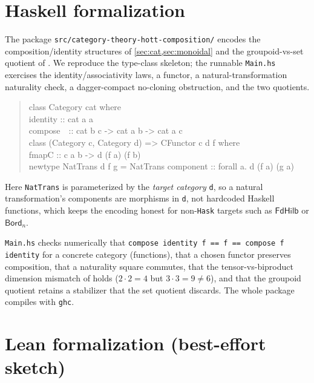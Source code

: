 \documentclass[12pt]{article}
\theoremstyle{definition}
\theoremstyle{remark}
\newcommand{\FdHilb}{\mathsf{FdHilb}}
\newcommand{\Bord}{\mathsf{Bord}}
\begin{document}
\section{Haskell formalization}
\label{sec:haskell}

The package \texttt{src/category-theory-hott-composition/} encodes the
composition/identity structures of \cref{sec:cat,sec:monoidal} and the
groupoid-vs-set quotient of . We reproduce the type-class
skeleton; the runnable \texttt{Main.hs} exercises the identity/associativity
laws, a functor, a natural-transformation naturality check, a dagger-compact
no-cloning obstruction, and the two quotients.

\begin{quote}\footnotesize\ttfamily
class Category cat where\\
\hspace*{2em}identity :: cat a a\\
\hspace*{2em}compose\ \ :: cat b c -> cat a b -> cat a c\\[0.4em]
class (Category c, Category d) => CFunctor c d f where\\
\hspace*{2em}fmapC :: c a b -> d (f a) (f b)\\[0.4em]
newtype NatTrans d f g = NatTrans  component :: forall a. d (f a) (g a) 
\end{quote}
Here \texttt{NatTrans} is parameterized by the \emph{target category}
\texttt{d}, so a natural transformation's components are morphisms in
\texttt{d}, not hardcoded Haskell functions, which keeps the encoding honest
for non-\texttt{Hask} targets such as $\FdHilb$ or $\Bord_n$.

\texttt{Main.hs} checks numerically that \texttt{compose identity f == f == compose
f identity} for a concrete category (functions), that a chosen functor preserves
composition, that a naturality square commutes, that the tensor-vs-biproduct
dimension mismatch of  holds ($2\cdot2=4$ but $3\cdot3=9\ne
6$), and that the groupoid quotient retains a stabilizer that the set quotient
discards. The whole package compiles with \texttt{ghc}.

\section{Lean formalization (best-effort sketch)}
\label{sec:lean}
\end{document}
